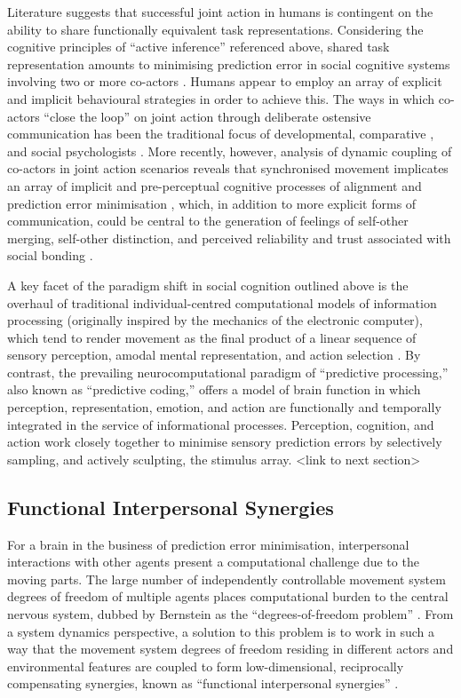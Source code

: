 Literature suggests that successful joint action in humans is contingent on the ability to share functionally equivalent task representations. Considering the cognitive principles of ``active inference'' referenced above, shared task representation amounts to minimising prediction error in social cognitive systems involving two or more co-actors \citep{Semin2008,Frith2010}.  Humans appear to employ an array of explicit and implicit behavioural strategies in order to achieve this.  The ways in which co-actors ``close the loop'' \citep{Frith2007} on joint action through deliberate ostensive communication has been the traditional focus of developmental, comparative \cite{Tomasello2005a}, and social psychologists \citep{Sebanz2006}.
More recently, however, analysis of dynamic coupling of co-actors in joint action scenarios reveals that synchronised movement implicates an array of implicit and pre-perceptual cognitive processes of alignment and prediction error minimisation \citep{Schmidt2011}, which, in addition to more explicit forms of communication, could be central to the generation of feelings of self-other merging, self-other distinction, and perceived reliability and trust associated with social bonding \citep{Marsh2009}.

A key facet of the paradigm shift in social cognition outlined above is the overhaul of traditional individual-centred computational models of information processing (originally inspired by the mechanics of the electronic computer), which tend to render movement as the final product of a linear sequence of sensory perception, amodal mental representation, and action selection \citep{Lewis2005}.  By contrast, the prevailing neurocomputational paradigm of ``predictive processing,'' also known as ``predictive coding,'' \citep[see][]{Frith2007,Kilner2009,Clark2013} offers a model of brain function in which perception, representation, emotion, and action are functionally and temporally integrated in the service of informational processes.  Perception, cognition, and action work closely together to minimise sensory prediction errors by selectively sampling, and actively sculpting, the stimulus array. <link to next section>

\subsection{Functional Interpersonal Synergies}
For a brain in the business of prediction error minimisation, interpersonal interactions with other agents present a computational challenge due to the moving parts.  The large number of independently controllable movement system degrees of freedom of multiple agents places computational burden to the central nervous system, dubbed by Bernstein \textcite{Bernstein1967} as the ``degrees-of-freedom problem'' \citep[see also][]{Turvey1982,Turvey1990}.  From a system dynamics perspective, a solution to this problem is to work in such a way that the movement system degrees of freedom residing in different actors and environmental features are coupled to form low-dimensional, reciprocally compensating synergies, known as ``functional interpersonal synergies'' \citep{Riley2011}.

